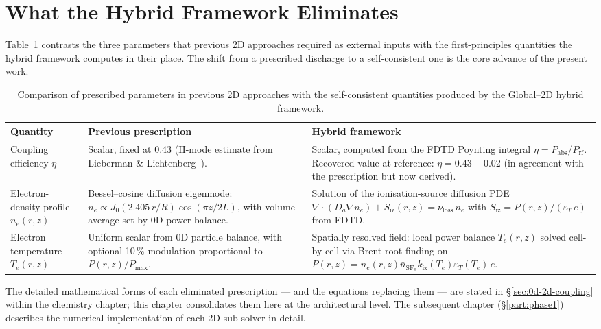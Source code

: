 \documentclass[11pt,a4paper]{report}
\begin{document}
\section{What the Hybrid Framework Eliminates}
\label{sec:hybrid-elimination}

Table~\ref{tab:prescribed-vs-hybrid} contrasts the three parameters that previous 2D approaches required as external inputs with the first-principles quantities the hybrid framework computes in their place.  The shift from a prescribed discharge to a self-consistent one is the core advance of the present work.

\begin{table}[H]
\centering
\caption{Comparison of prescribed parameters in previous 2D approaches with the self-consistent quantities produced by the Global--2D hybrid framework.}
\label{tab:prescribed-vs-hybrid}
\small
\begin{tabular}{@{}p{3.7cm}p{5.3cm}p{5.6cm}@{}}
\toprule
\textbf{Quantity} & \textbf{Previous prescription} & \textbf{Hybrid framework} \\
\midrule
Coupling efficiency $\eta$ &
  Scalar, fixed at 0.43 (H-mode estimate from Lieberman \& Lichtenberg~\cite{Lieberman2005}).
  & Scalar, computed from the FDTD Poynting integral $\eta = P_\mathrm{abs}/P_\mathrm{rf}$.  Recovered value at reference: $\eta = 0.43 \pm 0.02$ (in agreement with the prescription but now derived).
  \\[3pt]
Electron-density profile $n_e(r,z)$ &
  Bessel--cosine diffusion eigenmode: $n_e \propto J_0(2.405\,r/R)\cos(\pi z/2L)$, with volume average set by 0D power balance.
  & Solution of the ionisation-source diffusion PDE $\nabla\!\cdot\!(D_a \nabla n_e) + S_\mathrm{iz}(r,z) = \nu_\mathrm{loss}\, n_e$ with $S_\mathrm{iz} = P(r,z)/(\varepsilon_T\,e)$ from FDTD.
  \\[3pt]
Electron temperature $T_e(r,z)$ &
  Uniform scalar from 0D particle balance, with optional 10\,\% modulation proportional to $P(r,z)/P_\mathrm{max}$.
  & Spatially resolved field: local power balance $T_e(r,z)$ solved cell-by-cell via Brent root-finding on $P(r,z) = n_e(r,z)\bar{n}_{\mathrm{SF}_6}k_\mathrm{iz}(T_e)\varepsilon_T(T_e)\,e$.
  \\
\bottomrule
\end{tabular}
\end{table}

The detailed mathematical forms of each eliminated prescription --- and the equations replacing them --- are stated in \S\ref{sec:0d-2d-coupling} within the chemistry chapter; this chapter consolidates them here at the architectural level.  The subsequent chapter (\S\ref{part:phase1}) describes the numerical implementation of each 2D sub-solver in detail.
\end{document}
